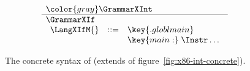 \documentclass[7x10]{TimesAPriori_MIT}%
\newcommand{\gray}[1]{{\color{gray} #1}}
\numberwithin{theorem}{chapter}
\numberwithin{definition}{chapter}
\numberwithin{equation}{chapter}
\begin{document}
\begin{figure}[tp]
\begin{tcolorbox}[colback=white]
\[
\begin{array}{l}
  \gray{\GrammarXInt} \\ \hline
  \GrammarXIf \\ 
\begin{array}{lcl}
\LangXIfM{} &::= &  \key{.globl main} \\
      &    & \key{main:} \; \Instr\ldots 
\end{array}
\end{array}
\]
\end{tcolorbox}
\caption{The concrete syntax of \LangXIf{}  (extends \LangXInt{} of figure~\ref{fig:x86-int-concrete}).}
\label{fig:x86-1-concrete}
\end{figure}

\newcommand{\ASTXIfRacket}{
\begin{array}{lcl}
\itm{bytereg} &::=& \key{ah} \MID \key{al} \MID \key{bh} \MID \key{bl}
    \MID \key{ch} \MID \key{cl} \MID \key{dh} \MID \key{dl} \\
\Arg &::=&  \BYTEREG{\itm{bytereg}} \\
\itm{cc} & ::= & \key{e} \MID \key{l} \MID \key{le} \MID \key{g} \MID \key{ge} \\
\Instr &::=& \BININSTR{\code{xorq}}{\Arg}{\Arg}
       \MID \BININSTR{\code{cmpq}}{\Arg}{\Arg}\\
       &\MID& \BININSTR{\code{set}}{\itm{cc}}{\Arg} 
       \MID \BININSTR{\code{movzbq}}{\Arg}{\Arg}\\
       &\MID&  \JMPIF{'\itm{cc}'}{\itm{label}} 
\end{array}
}
\end{document}
